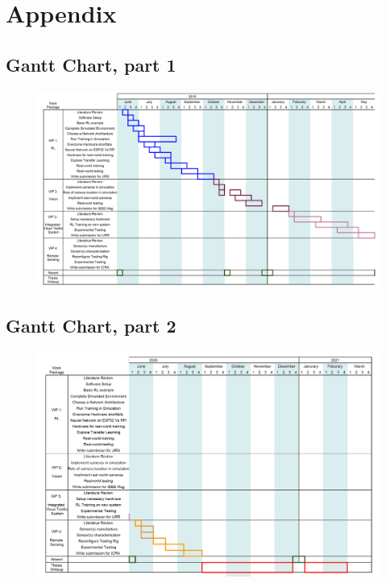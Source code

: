 \chapter{Appendix}
\appendix
\newpage
\section{Gantt Chart, part 1}\label{Gantt1}
\begin{figure}[h!]
    \centering
    \includegraphics[width=0.93\textheight, angle=270]{Images/GanttChart/Gantt1.png}
\end{figure}
\newpage
\section{Gantt Chart, part 2}\label{Gantt2}
\begin{figure}[h!]
    \centering
    \includegraphics[width=0.93\textheight, angle=270]{Images/GanttChart/Gantt2.png}
\end{figure}

